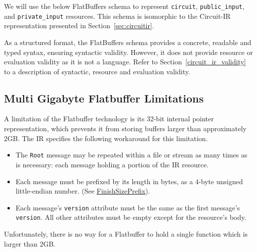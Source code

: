 \begin{appendices}
We will use the below FlatBuffers schema to represent \texttt{circuit}, \texttt{public\_input}, and \texttt{private\_input} resources. This schema is isomorphic to the Circuit-IR representation presented in Section~\ref{sec:circuitir}.



As a structured format, the FlatBuffers schema provides a concrete, readable and typed syntax,
ensuring syntactic validity.
However, it does not provide resource or evaluation validity as it is not a language.
Refer to Section~\ref{circuit_ir_validity} to a description of syntactic, resource and evaluation validity.

\subsection{Multi Gigabyte Flatbuffer Limitations}
A limitation of the Flatbuffer technology is its 32-bit internal pointer representation, which prevents it from storing buffers larger than approximately 2GB.
The IR specifies the following workaround for this limitation.

\begin{itemize}
    \item The \texttt{Root} message may be repeated within a file or stream as many times as is necessary: each message holding a portion of the IR resource.
    \item Each message must be prefixed by its length in bytes, as a 4-byte unsigned little-endian number. (See \href{https://google.github.io/flatbuffers/class_flat_buffers_1_1_flat_buffer_builder.html#a425ab2bd13a0e4331a7190ec2d17c3b2}{FinishSizePrefix}).
    \item Each message's \texttt{version} attribute must be the same as the first message's \texttt{version}. All other attributes must be empty except for the resource's body.
\end{itemize}

Unfortunately, there is no way for a Flatbuffer to hold a single function which is larger than 2GB.

\end{appendices}
